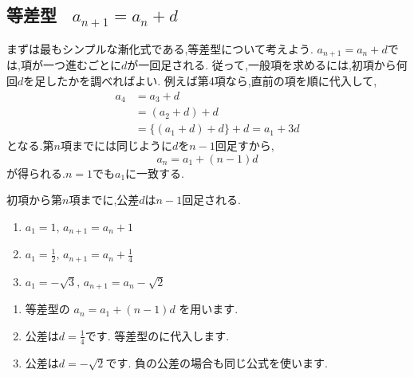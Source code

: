 
  \subsection{\texorpdfstring{等差型 \, $a_{n+1}=a_n+d$}{等差型}}\label{節：等差型}
    まずは最もシンプルな漸化式である,等差型について考えよう.
    $a_{n+1}=a_n+d$では,項が一つ進むごとに$d$が一回足される.
    従って,一般項を求めるには,初項から何回$d$を足したかを調べればよい.
    例えば第4項なら,直前の項を順に代入して,
    \begin{align*}
      a_4&=a_3+d\\
         &=(a_2+d)+d\\
         &=\{(a_1+d)+d\}+d=a_1+3d
    \end{align*}
    となる.第$n$項までには同じように$d$を$n-1$回足すから,
    \[
      a_n=a_1+(n-1)d
    \]
    が得られる.$n=1$でも$a_1$に一致する.
  \begin{bookpoint}
    初項から第$n$項までに,公差$d$は$n-1$回足される.
  \end{bookpoint}

    \noindent {}\par\nobreak
    \begin{enumerate}[label=(\arabic*),parsep=3pt,format=\bookitemlink{example-arithmetic-1}{problem}{answer}]
      \item $\displaystyle a_1=1,\, a_{n+1}=a_n+1$
      \item $\displaystyle a_1=\frac{1}{2},\, a_{n+1}=a_n+\frac{1}{4}$
      \item $\displaystyle a_1=-\sqrt{3},\, a_{n+1}=a_n-\sqrt{2}$
    \end{enumerate}

    \noindent{}\par\nobreak
    \begin{enumerate}[label=(\arabic*),parsep=3pt,format=\bookitemlink{example-arithmetic-1}{hint}{problem}]
      \item 等差型の
            $\displaystyle a_n=a_1+(n-1)d$
            を用います.
      \item 公差は$\displaystyle d=\frac14$です.
            等差型のに代入します.
      \item 公差は$\displaystyle d=-\sqrt2$です.
            負の公差の場合も同じ公式を使います.
    \end{enumerate}

